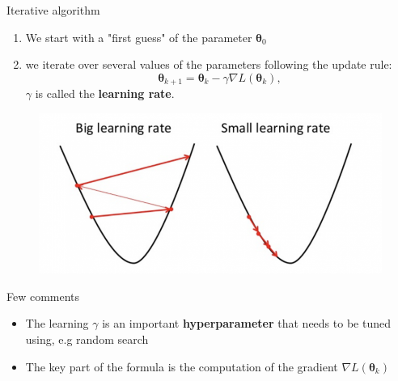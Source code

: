 \documentclass[handout]{beamer}
\begin{document}
 \begin{frame}{Iterative algorithm}
  \begin{enumerate}[<+->]
      \item We start with a "first guess" of the parameter $\boldsymbol{\theta}_0$
      \item we iterate over several values of the parameters following the update rule:
      $$
      \boldsymbol{\theta}_{k+1} = \boldsymbol{\theta}_{k} - \gamma \nabla L(\boldsymbol{\theta}_{k}),
      $$
      $\gamma$ is called the \alert{\bf learning rate}.
  \end{enumerate}   
  \pause
  \begin{figure}
    \centering
    \includegraphics[width=.8\textwidth]{fig/L3/gradient-descent-learning-rate.png}
\end{figure}
 \end{frame}

\begin{frame}{Few comments}
\begin{itemize}[<+->]
\item The learning $\gamma$ is an important \alert{\bf hyperparameter} that needs to be tuned using, e.g random search
\item The key part of the formula is the computation of the gradient $\nabla L(\boldsymbol{\theta}_{k})$
\end{itemize}
\end{frame}
\end{document}
